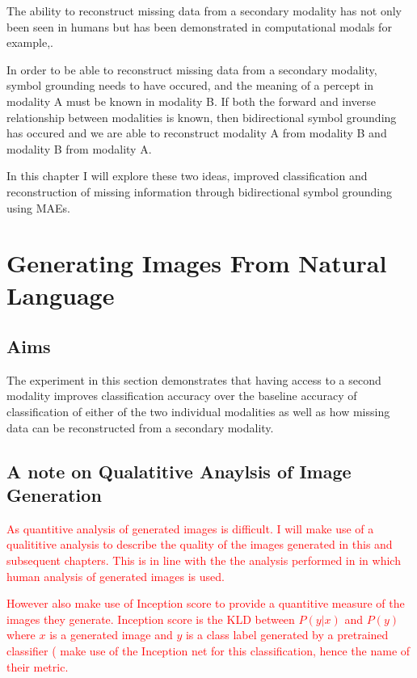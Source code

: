 The ability to reconstruct missing data from a secondary modality has not only been seen in humans \cite{ma2009lip, samuel1997lexical} but has been demonstrated in computational modals for example,\cite{ngiam2011multimodal, silberer2014learning}.

In order to be able to reconstruct missing data from a secondary modality, symbol grounding needs to have occured, and the meaning of a percept in modality A must be known in modality B.
If both the forward and inverse relationship between modalities is known, then bidirectional symbol grounding has occured and we are able to reconstruct modality A from modality B and modality B from modality A.

In this chapter I will explore these two ideas, improved classification and reconstruction of missing information through  bidirectional symbol grounding using \acp{MAE}.



\section{Generating Images From Natural Language}
\subsection{Aims}
The experiment in this section demonstrates that having access to a second modality improves classification accuracy over the baseline accuracy of classification of either of the two individual modalities as well as how missing data can be reconstructed from a secondary modality.

\subsection{A note on Qualatitive Anaylsis of Image Generation}
\textcolor{red}{As quantitive analysis of generated images is difficult. I will make use of a qualititive analysis to describe the quality of the images generated in this and subsequent chapters.
This is in line with the the analysis performed in \cite{reed2016generative, zhang2017stackgan, xu2018attngan, li2018video, mansimov2015generating} in which human analysis of generated images is used.}

\textcolor{red}{However \cite{zhang2017stackgan, xu2018attngan, li2018video} also make use of Inception score to provide a quantitive measure of the images they generate. Inception score is the \ac{KLD} between $P(y|x)$ and $P(y)$ where $x$ is a generated image and $y$ is a class label generated by a pretrained classifier (\cite{zhang2017stackgan, xu2018attngan, li2018video} make use of the Inception net \cite{szegedy2017inception} for this classification, hence the name of their metric.}

